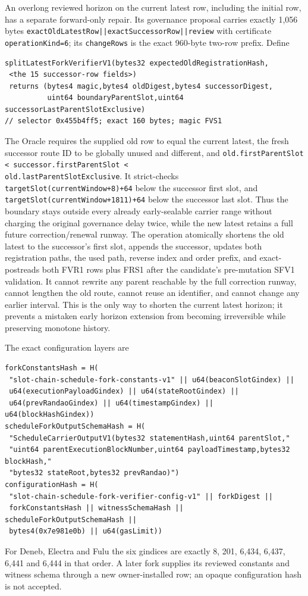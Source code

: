 \documentclass[a4paper,11pt]{article}
\newcommand{\code}[1]{\nolinkurl{#1}}
\begin{document}
An overlong reviewed horizon on the current latest row, including the initial
row, has a separate forward-only repair.  Its governance proposal carries
exactly 1,056 bytes \code{exactOldLatestRow||exactSuccessorRow||review} with
certificate \code{operationKind=6}; its \code{changeRows} is the exact
960-byte two-row prefix.  Define
\begin{verbatim}
splitLatestForkVerifierV1(bytes32 expectedOldRegistrationHash,
 <the 15 successor-row fields>)
 returns (bytes4 magic,bytes4 oldDigest,bytes4 successorDigest,
          uint64 boundaryParentSlot,uint64 successorLastParentSlotExclusive)
// selector 0x455b4ff5; exact 160 bytes; magic FVS1
\end{verbatim}
The Oracle requires the supplied old row to equal the current latest,
the fresh successor route ID to be globally unused and different, and
\code{old.firstParentSlot < successor.firstParentSlot <
old.lastParentSlotExclusive}.  It strict-checks
\code{targetSlot(currentWindow+8)+64} below the successor first slot, and
\code{targetSlot(currentWindow+1811)+64} below the successor last slot.
Thus the boundary stays outside every already early-sealable carrier range
without charging the original governance delay twice, while the new latest
retains a full future correction/renewal runway.  The operation atomically
shortens the old latest to the successor's
first slot, appends the successor, updates both registration paths, the used
path, reverse index and order prefix, and exact-postreads both FVR1 rows plus
FRS1 after the candidate's pre-mutation SFV1 validation.  It cannot rewrite any parent reachable by the full correction
runway, cannot lengthen the old route, cannot reuse an identifier, and cannot
change any earlier interval.  This is the only way to shorten the current
latest horizon; it prevents a mistaken early horizon extension from becoming
irreversible while preserving monotone history.

The exact configuration layers are
\begin{verbatim}
forkConstantsHash = H(
 "slot-chain-schedule-fork-constants-v1" || u64(beaconSlotGindex) ||
 u64(executionPayloadGindex) || u64(stateRootGindex) ||
 u64(prevRandaoGindex) || u64(timestampGindex) || u64(blockHashGindex))
scheduleForkOutputSchemaHash = H(
 "ScheduleCarrierOutputV1(bytes32 statementHash,uint64 parentSlot,"
 "uint64 parentExecutionBlockNumber,uint64 payloadTimestamp,bytes32 blockHash,"
 "bytes32 stateRoot,bytes32 prevRandao)")
configurationHash = H(
 "slot-chain-schedule-fork-verifier-config-v1" || forkDigest ||
 forkConstantsHash || witnessSchemaHash || scheduleForkOutputSchemaHash ||
 bytes4(0x7e981e0b) || u64(gasLimit))
\end{verbatim}
For Deneb, Electra and Fulu the six gindices are exactly 8, 201, 6,434,
6,437, 6,441 and 6,444 in that order.  A later fork supplies its reviewed
constants and witness schema through a new owner-installed row; an opaque
configuration hash is not accepted.
\end{document}
